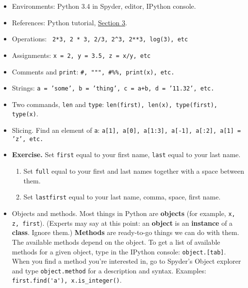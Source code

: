 \documentclass[11pt]{article}
\begin{document}
\begin{itemize}
\item Environments:  Python 3.4 in Spyder, editor, IPython console.
\item References:
 {Python tutorial},
\href{https://docs.python.org/3.4/tutorial/introduction.html}{Section 3}.

\item Operations:  \verb: 2*3, 2 * 3, 2/3, 2^3, 2**3, log(3), etc :

\item Assignments:  {\tt x = 2, y = 3.5, z = x/y, etc }
\item Comments and {\tt print}:  \verb:#, """, #%%, print(x), etc. :



\item Strings:  {\tt a = 'some', b = 'thing', c = a+b, d = '11.32', etc.}

\item Two commands,  {\tt len} and {\tt type}:
{\tt len(first), len(x), type(first), type(x)}.

\item Slicing.  Find an element of {\tt a}: {\tt a[1], a[0], a[1:3], a[-1], a[:2], a[1] = 'z', etc.}

\item {\bf Exercise.}  Set {\tt first} equal to your first name, {\tt last} equal to your last name.
\begin{enumerate}[label=(\alph*)]
\item Set {\tt full} equal to your first and last names together with a space between them.
\item Set {\tt lastfirst} equal to your last name, comma, space, first name.
\end{enumerate}

\item Objects and methods.
Most things in Python are {\bf objects}
(for example, {\tt x, z, first}).
(Experts may say at this point:  an {\bf object} is an {\bf instance} of a {\bf class}.
Ignore them.)
{\bf Methods} are ready-to-go things we can do with them.
The available methods depend on the object.
To get a list of available methods for a given object,
type in the IPython console: {\tt object.[tab]}.
When you find a method you're interested in,
go to Spyder's Object explorer
and type {\tt object.method} for a description and syntax.
Examples:  \verb:first.find('a'), x.is_integer():.


\end{itemize}
\end{document}
